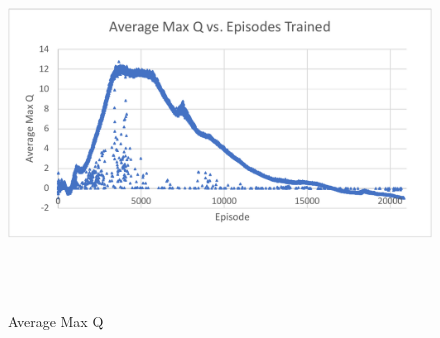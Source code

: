 \begin{figure}[H]
	\includegraphics[width=6in, height=3.85in, keepaspectratio]{figures/train_figs/all_q.pdf}
	\caption{Average Max Q} \label{fig:all_q}
\end{figure}


